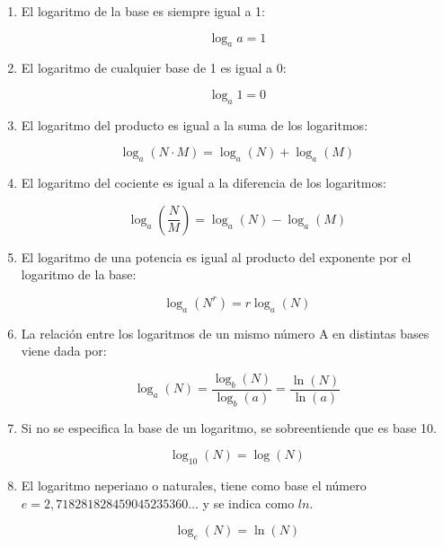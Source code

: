 \vspace{5mm}

\begin{enumerate}

\item El logaritmo de la base es siempre igual a 1:

\begin{equation*}
    \log_a a = 1
\end{equation*}

\item El logaritmo de cualquier base de 1 es igual a 0:

\begin{equation*}
    \log_a 1 = 0
\end{equation*}

\item El logaritmo del producto es igual a la suma de los logaritmos:

\begin{equation*}
    \log_a (N \cdot M) =\log_a (N)+\log_a (M)
\end{equation*}

\item El logaritmo del cociente es igual a la diferencia de los logaritmos:

\begin{equation*}
    \log_a (\dfrac {N}{M}) = \log_a (N)-\log_a (M)
\end{equation*}

\item El logaritmo de una potencia es igual al producto del exponente por el logaritmo de la base:

\begin{equation*}
    \log_a (N^r) =r\log_a (N)
\end{equation*}

\item La relación entre los logaritmos de un mismo número A en distintas bases viene dada por:

\begin{equation*}
    \log_a (N) =\dfrac {\log_b (N)}{\log_b (a)} =\dfrac {\ln (N)}{\ln (a)}
\end{equation*}

\item Si no se especifica la base de un logaritmo, se sobreentiende que es base 10.

\begin{equation*}
    \log_{10} (N) =\log (N)
\end{equation*}

\item El logaritmo neperiano o naturales, tiene como base el número $e = 2,718281828459045235360...$ y se indica como $ln$.

\begin{equation*}
    \log_e (N)=\ln (N)
\end{equation*}

\end{enumerate}


